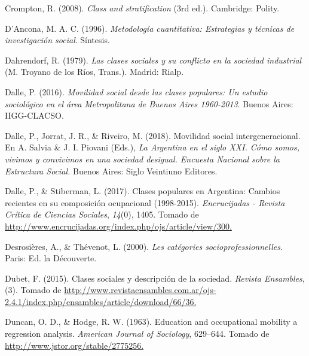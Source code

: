 \documentclass[
]{article}
\newlength{\cslhangindent}
\newlength{\cslentryspacingunit} %
\newenvironment{CSLReferences}[2] %
 {%
  \setlength{\parindent}{0pt}
  \ifodd #1
  \let\oldpar\par
  \def\par{\hangindent=\cslhangindent\oldpar}
  \fi
  \setlength{\parskip}{#2\cslentryspacingunit}
 }%
 {}
\begin{document}
\begin{CSLReferences}{1}{0}
\leavevmode{}%
Crompton, R. (2008). \emph{Class and stratification} (3rd ed.). Cambridge: Polity.

\leavevmode{}%
D'Ancona, M. A. C. (1996). \emph{Metodología cuantitativa: Estrategias y técnicas de investigación social}. Síntesis.

\leavevmode{}%
Dahrendorf, R. (1979). \emph{Las clases sociales y su conflicto en la sociedad industrial} (M. Troyano de los Ríos, Trans.). Madrid: Rialp.

\leavevmode{}%
Dalle, P. (2016). \emph{Movilidad social desde las clases populares: Un estudio sociológico en el área {Metropolitana} de {Buenos} {Aires} 1960-2013}. Buenos Aires: IIGG-CLACSO.

\leavevmode{}%
Dalle, P., Jorrat, J. R., \& Riveiro, M. (2018). Movilidad social intergeneracional. En A. Salvia \& J. I. Piovani (Eds.), \emph{La {Argentina} en el siglo {XXI}. {Cómo} somos, vivimos y convivimos en una sociedad desigual. {Encuesta} {Nacional} sobre la {Estructura} {Social}.} Buenos Aires: Siglo Veintiuno Editores.

\leavevmode{}%
Dalle, P., \& Stiberman, L. (2017). Clases populares en {Argentina}: Cambios recientes en su composición ocupacional (1998-2015). \emph{Encrucijadas - Revista Crítica de Ciencias Sociales}, \emph{14}(0), 1405. Tomado de \href{http://www.encrucijadas.org/index.php/ojs/article/view/300}{http://www.encrucijadas.org/index.php/ojs/article/view/300.}

\leavevmode{}%
Desrosières, A., \& Thévenot, L. (2000). \emph{Les catégories socioprofessionnelles}. Paris: Ed. la Découverte.

\leavevmode{}%
Dubet, F. (2015). Clases sociales y descripción de la sociedad. \emph{Revista Ensambles}, (3). Tomado de \href{http://www.revistaensambles.com.ar/ojs-2.4.1/index.php/ensambles/article/download/66/36}{http://www.revistaensambles.com.ar/ojs-2.4.1/index.php/ensambles/article/download/66/36.}

\leavevmode{}%
Duncan, O. D., \& Hodge, R. W. (1963). Education and occupational mobility a regression analysis. \emph{American Journal of Sociology}, 629--644. Tomado de \href{http://www.jstor.org/stable/2775256}{http://www.jstor.org/stable/2775256.}


\end{CSLReferences}
\end{document}
